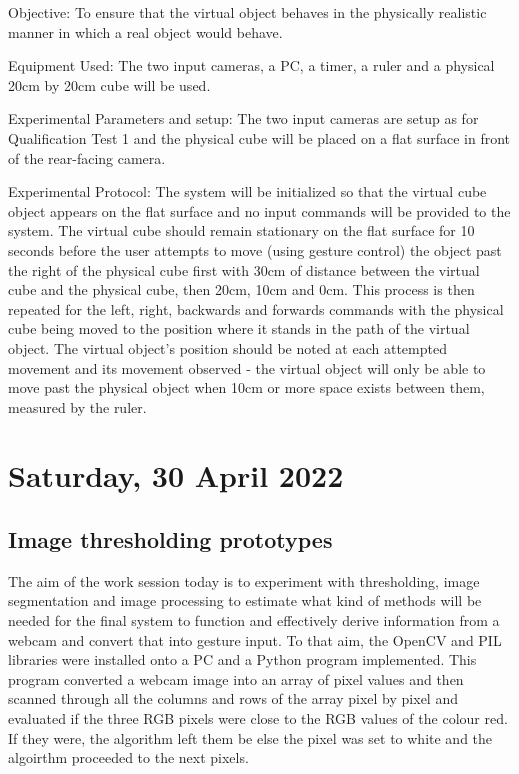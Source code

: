 Objective: To ensure that the virtual object behaves in the physically realistic manner in which a real object would behave.

Equipment Used: The two input cameras, a PC, a timer, a ruler and a physical 20cm by 20cm cube will be used.

Experimental Parameters and setup: The two input cameras are setup as for Qualification Test 1 and the physical cube will be placed on a flat surface in front of the rear-facing camera.

Experimental Protocol: The system will be initialized so that the virtual cube object appears on the flat surface and no input commands will be provided to the system. The virtual cube should remain stationary on the flat surface for 10 seconds before the user attempts to move (using gesture control) the object past the right of the physical cube first with 30cm of distance between the virtual cube and the physical cube, then 20cm, 10cm and 0cm. This process is then repeated for the left, right, backwards and forwards commands with the physical cube being moved to the position where it stands in the path of the virtual object. The virtual object's position should be noted at each attempted movement and its movement observed - the virtual object will only be able to move past the physical object when 10cm or more space exists between them, measured by the ruler.

\section[2022/04/30]{Saturday, 30 April 2022}

\subsection{Image thresholding prototypes}

The aim of the work session today is to experiment with thresholding, image segmentation and image processing to estimate what kind of methods will be needed for the final system to function and effectively derive information from a webcam and convert that into gesture input. To that aim, the OpenCV and PIL libraries were installed onto a PC and a Python program implemented. This program converted a webcam image into an array of pixel values and then scanned through all the columns and rows of the array pixel by pixel and evaluated if the three RGB pixels were close to the RGB values of the colour red. If they were, the algorithm left them be else the pixel was set to white and the algoirthm proceeded to the next pixels. \\


